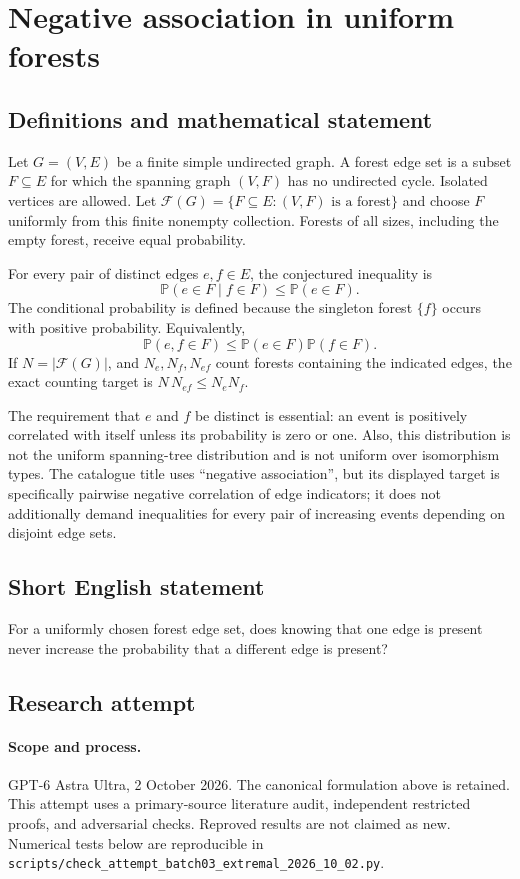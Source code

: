 \documentclass[11pt,a4paper]{article}
\begin{document}
\section*{Negative association in uniform forests}\label{statement}

\subsection{Definitions and mathematical statement}
Let $G=(V,E)$ be a finite simple undirected graph. A forest edge set
is a subset $F\subseteq E$ for which the spanning graph $(V,F)$ has
no undirected cycle. Isolated vertices are allowed. Let
$\mathcal F(G)=\{F\subseteq E:(V,F)\text{ is a forest}\}$ and choose
$F$ uniformly from this finite nonempty collection. Forests of all
sizes, including the empty forest, receive equal probability.

For every pair of distinct edges $e,f\in E$, the conjectured inequality
is
\[
                  \mathbb P(e\in F\mid f\in F)
                              \le\mathbb P(e\in F).
\]
The conditional probability is defined because the singleton forest
$\{f\}$ occurs with positive probability. Equivalently,
\[
            \mathbb P(e,f\in F)\le
                         \mathbb P(e\in F)\mathbb P(f\in F).
\]
If $N=|\mathcal F(G)|$, and $N_e,N_f,N_{ef}$ count forests containing
the indicated edges, the exact counting target is
$N\,N_{ef}\le N_eN_f$.

The requirement that $e$ and $f$ be distinct is essential: an event is
positively correlated with itself unless its probability is zero or
one. Also, this distribution is not the uniform spanning-tree
distribution and is not uniform over isomorphism types. The catalogue
title uses ``negative association'', but its displayed target is
specifically pairwise negative correlation of edge indicators; it
does not additionally demand inequalities for every pair of increasing
events depending on disjoint edge sets.
\subsection{Short English statement}
For a uniformly chosen forest edge set, does knowing that one edge is present never increase the probability that a different edge is present?
\subsection{Research attempt}
\paragraph{Scope and process.}
GPT-6 Astra Ultra, 2 October 2026. The canonical formulation above is retained. This attempt uses a primary-source literature audit, independent restricted proofs, and adversarial checks. Reproved results are not claimed as new. Numerical tests below are reproducible in \texttt{scripts/check\_attempt\_batch03\_extremal\_2026\_10\_02.py}.
\end{document}

